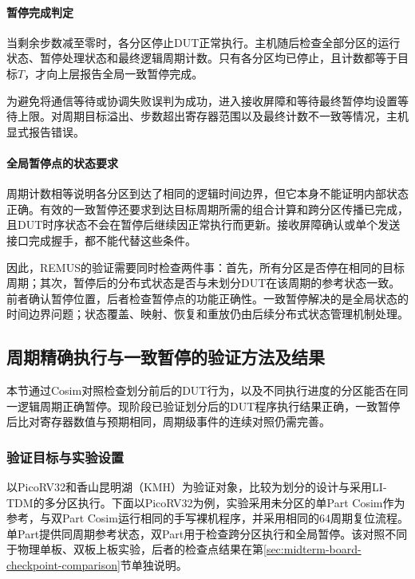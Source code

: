 \paragraph{暂停完成判定}

当剩余步数减至零时，各分区停止DUT正常执行。主机随后检查全部分区的运行状态、暂停处理状态和最终逻辑周期计数。只有各分区均已停止，且计数都等于目标$T$，才向上层报告全局一致暂停完成。

为避免将通信等待或协调失败误判为成功，进入接收屏障和等待最终暂停均设置等待上限。对周期目标溢出、步数超出寄存器范围以及最终计数不一致等情况，主机显式报告错误。

\paragraph{全局暂停点的状态要求}

周期计数相等说明各分区到达了相同的逻辑时间边界，但它本身不能证明内部状态正确。有效的一致暂停还要求到达目标周期所需的组合计算和跨分区传播已完成，且DUT时序状态不会在暂停后继续因正常执行而更新。接收屏障确认或单个发送接口完成握手，都不能代替这些条件。

因此，REMUS的验证需要同时检查两件事：首先，所有分区是否停在相同的目标周期；其次，暂停后的分布式状态是否与未划分DUT在该周期的参考状态一致。前者确认暂停位置，后者检查暂停点的功能正确性。一致暂停解决的是全局状态的时间边界问题；状态覆盖、映射、恢复和重放仍由后续分布式状态管理机制处理。

\subsection{周期精确执行与一致暂停的验证方法及结果}
\label{sec:midterm-cycle-cosim}

本节通过Cosim对照检查划分前后的DUT行为，以及不同执行进度的分区能否在同一逻辑周期正确暂停。现阶段已验证划分后的DUT程序执行结果正确，一致暂停后比对寄存器数值与预期相同，周期级事件的连续对照仍需完善。

\subsubsection{验证目标与实验设置}

以PicoRV32和香山昆明湖（KMH）为验证对象，比较为划分的设计与采用LI-TDM的多分区执行。下面以PicoRV32为例，实验采用未分区的单Part Cosim作为参考，与双Part Cosim运行相同的手写裸机程序，并采用相同的64周期复位流程。单Part提供同周期参考状态，双Part用于检查跨分区执行和全局暂停。该对照不同于物理单板、双板上板实验，后者的检查点结果在第\ref{sec:midterm-board-checkpoint-comparison}节单独说明。

